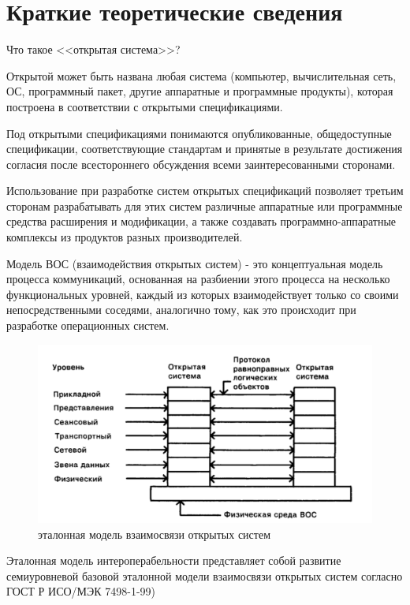 \section{Краткие теоретические сведения}

Что такое <<открытая система>>?

Открытой может быть названа любая система (компьютер, вычислительная сеть, ОС, программный пакет, другие аппаратные и программные продукты), которая построена в соответствии с открытыми спецификациями.

Под открытыми спецификациями понимаются опубликованные, общедоступные спецификации, соответствующие стандартам и принятые в результате достижения согласия после всестороннего обсуждения всеми заинтересованными сторонами.

Использование при разработке систем открытых спецификаций позволяет третьим сторонам разрабатывать для этих систем различные аппаратные или программные средства расширения и модификации, а также создавать программно-аппаратные комплексы из продуктов разных производителей.

Модель ВОС (взаимодействия открытых систем) - это концептуальная модель процесса коммуникаций, основанная на разбиении этого процесса на несколько функциональных уровней, каждый из которых взаимодействует только со своими непосредственными соседями, аналогично тому, как это происходит при разработке операционных систем. 

\begin{figure}[H]
    \centering
    \includegraphics[width=.9\textwidth]{img/vos.png}
    \caption{эталонная модель взаимосвязи открытых систем}
\end{figure}


Эталонная модель интероперабельности представляет собой развитие семиуровневой базовой эталонной модели взаимосвязи открытых систем согласно ГОСТ Р ИСО/МЭК 7498-1-99)

